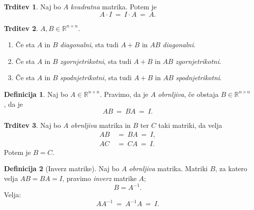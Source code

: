 \documentclass[11pt]{article}
\newcommand{\R}{\mathbb{R}}
\newcommand{\0}{\mathbf{0}}
\theoremstyle{definition}
\newtheorem{definicija}{Definicija}[section]
\theoremstyle{definition}
\newtheorem{trditev}{Trditev}[section]
\theoremstyle{definition}
\theoremstyle{definition}
\begin{document}
\begin{trditev}

Naj bo $A$ \textit{kvadratna} matrika. Potem je
$$A \cdot I ~=~ I \cdot A ~=~ A.$$

\end{trditev}
\vspace{0.5cm}

\begin{trditev}

$A,B \in \R^{n \times n}$.
\begin{enumerate}
	\item Če sta $A$ in $B$ \textit{diagonalni}, sta tudi $A+B$ in $AB$ \textit{diagonalni}.
	\item Če sta $A$ in $B$ \textit{zgornjetrikotni}, sta tudi $A+B$ in $AB$ \textit{zgornjetrikotni}.
	\item Če sta $A$ in $B$ \textit{spodnjetrikotni}, sta tudi $A+B$ in $AB$ \textit{spodnjetrikotni}.
\end{enumerate}

\end{trditev}
\vspace{0.5cm}

\begin{definicija}

Naj bo $A \in \R^{n \times n}$. Pravimo, da je $A$ \textit{obrnljiva}, če obstaja $B \in \R^{n \times n}$, da je 
$$AB ~=~ BA ~=~ I.$$

\end{definicija}
\vspace{0.5cm}

\begin{trditev}

Naj bo $A$ \textit{obrnljiva} matrika in $B$ ter $C$ taki matriki, da velja
\begin{align*}
AB ~&=~ BA ~=~ I, \\
AC ~&=~ CA ~=~ I.
\end{align*}
Potem je $B=C$.

\end{trditev}
\vspace{0.5cm}

\begin{definicija}[Inverz matrike]

Naj bo $A$ \textit{obrnljiva} matrika. Matriki $B$, za katero velja $AB = BA = I$, pravimo \textit{inverz} matrike $A$;
$$B = A^{-1}.$$
Velja:
$$A A^{-1} ~=~ A^{-1} A ~=~ I.$$

\end{definicija}
\vspace{0.5cm}
\end{document}
